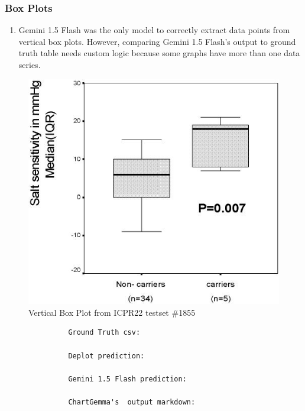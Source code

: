 \documentclass[
	letterpaper, %
]{jdf}
\begin{document}
\subsubsection{Box Plots}\label{sssect:box}
\begin{enumerate}
         \item Gemini 1.5 Flash was the only model to correctly extract data points from vertical box plots.
             However, comparing Gemini 1.5 Flash's output to ground truth table needs custom logic because some graphs have more than one data series.
              \end{enumerate}
              \begin{figure}
                   \includegraphics{test-sample/icpr22/images/vertical-box/PMC1855992___g001.jpg}
                   \caption{Vertical Box Plot from ICPR22 testset \#1855}
                   \label{fig:icpr22-box-185}
                    \end{figure}
               \begin{verbatim}
               Ground Truth csv:
               
               Deplot prediction:
               
               Gemini 1.5 Flash prediction:
               
               ChartGemma's  output markdown:
               
               \end{verbatim}
\end{document}
